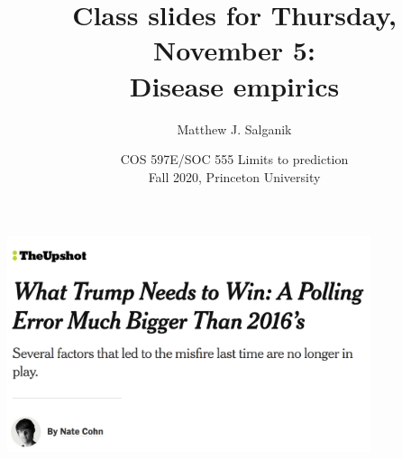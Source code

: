 \documentclass[aspectratio=169]{beamer}
\title[]{Class slides for Thursday, November 5:\\Disease empirics}
\author[]{Matthew J. Salganik}
\institute[]{}
\date[]{COS 597E/SOC 555 Limits to prediction\\Fall 2020, Princeton University}
\begin{document}
\frame{\titlepage}
\begin{frame}

\begin{center}
  \includegraphics[width = 0.8\textwidth]{figures/cohn_what_2020_title}
\end{center}

\end{frame}
\end{document}
